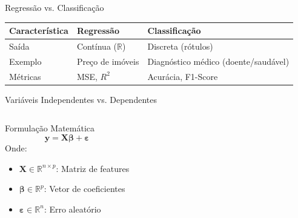 \documentclass{beamer}
\begin{document}
\begin{frame}{Regressão vs. Classificação}
\vspace*{-1cm}
\footnotesize
  \begin{table}[h!]
    \centering
    \begin{tabular}{|l|l|l|}
      \hline
      \textbf{Característica} & \textbf{Regressão} & \textbf{Classificação} \\
      \hline
      Saída & Contínua (\( \mathbb{R} \)) & Discreta (rótulos) \\
      Exemplo & Preço de imóveis & Diagnóstico médico (doente/saudável) \\
      Métricas & MSE, \( R^2 \) & Acurácia, F1-Score \\
      \hline
    \end{tabular}
  \end{table}


\end{frame}

\begin{frame}{Variáveis Independentes vs. Dependentes}
  \begin{columns}
    \begin{block}{Formulação Matemática}
      \[
      \mathbf{y} = \mathbf{X}\boldsymbol{\beta} + \boldsymbol{\varepsilon}
      \]
      Onde:
      \begin{itemize}
        \item \( \mathbf{X} \in \mathbb{R}^{n \times p} \): Matriz de features
        \item \( \boldsymbol{\beta} \in \mathbb{R}^p \): Vetor de coeficientes
        \item \( \boldsymbol{\varepsilon} \in \mathbb{R}^n \): Erro aleatório
      \end{itemize}
    \end{block}

  \end{columns}
\end{frame}
\end{document}
